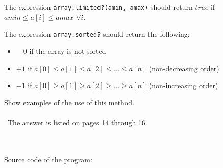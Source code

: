 \documentclass{article}
\begin{document}
	The expression \texttt{array.limited?(amin, amax)} should return \(true\) if  \(amin  \leqslant  a[i]  \leqslant  amax\) \(\forall i\). \newline
	
	The expression \texttt{array.sorted?} should return the following: 
	\begin{itemize}
		\item \ \ \(0\) \quad  if the array is not sorted
		\item \(+1\) \quad if \(a[0] \leqslant a[1] \leqslant a[2] \leqslant ... \leqslant a[n]\) (non-decreasing order)
		\item \(-1\) \quad if \(a[0] \geqslant a[1] \geqslant a[2] \geqslant ... \geqslant a[n]\) (non-increasing order)
	\end{itemize}
	
	Show examples of the use of this method.

\paragraph{}\
The answer is listed on pages 14 through 16.
\paragraph{}\	

Source code of the program:
\end{document}
